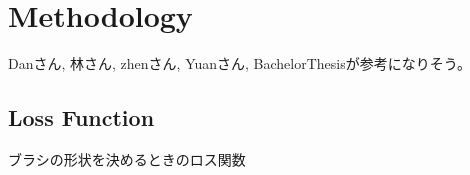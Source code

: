 \chapter{Methodology}
Danさん, 林さん, zhenさん, Yuanさん, BachelorThesisが参考になりそう。
\section{Loss Function}

ブラシの形状を決めるときのロス関数